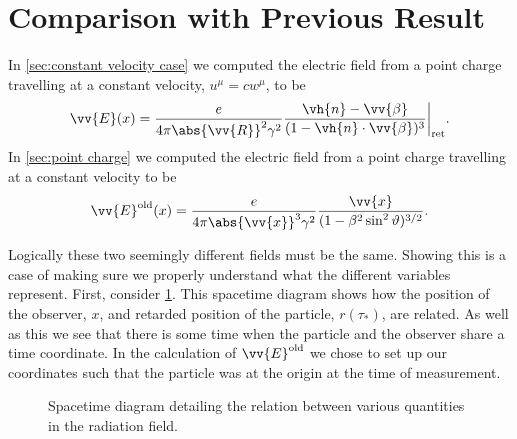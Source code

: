 \documentclass[fleqn]{NotesClass}
\newcommand*{\ret}{{\text{ret}}}
\begin{document}
    \section{Comparison with Previous Result}
    In \cref{sec:constant velocity case} we computed the electric field from a point charge travelling at a constant velocity, \(u^\mu = cw^\mu\), to be
    \begin{equation}
        \vv{E}(x) = \frac{e}{4\pi \abs{\vv{R}}^2 \gamma^2} \frac{\vh{n} - \vv{\beta}}{(1 - \vh{n} \cdot \vv{\beta})^3} \bigg|_{\ret}.
    \end{equation}
    In \cref{sec:point charge} we computed the electric field from a point charge travelling at a constant velocity to be
    \begin{equation}
        \vv{E}^{\text{old}}(x) = \frac{e}{4\pi \abs{\vv{x}}^{3} \gamma^2} \frac{\vv{x}}{(1 - \beta^2 \sin^2 \vartheta)^{3/2}}.
    \end{equation}
    
    Logically these two seemingly different fields must be the same.
    Showing this is a case of making sure we properly understand what the different variables represent.
    First, consider \cref{fig:spacetime radiation field quantities}.
    This spacetime diagram shows how the position of the observer, \(x\), and retarded position of the particle, \(r(\tau_*)\), are related.
    As well as this we see that there is some time when the particle and the observer share a time coordinate.
    In the calculation of \(\vv{E}^{\text{old}}\) we chose to set up our coordinates such that the particle was at the origin at the time of measurement.
    
    \begin{figure}
        \caption{Spacetime diagram detailing the relation between various quantities in the radiation field.}
        \label{fig:spacetime radiation field quantities}
    \end{figure}
    
\end{document}
